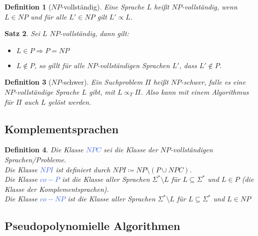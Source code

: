 \documentclass[11pt]{article}
\newcommand{\tcol}[1]{\textcolor{RoyalBlue}{#1}}
\theoremstyle{break}
\newtheorem{satz}{Satz}[section]
\newtheorem{defi}[satz]{Definition}
\begin{document}
    \begin{defi}[$NP$-vollständig]
        Eine Sprache $L$ heißt $NP$-vollständig, wenn $L\in NP$ und für alle $L'\in NP$ gilt $L'\propto L$.
    \end{defi}

    \begin{satz}
        Sei $L$ $NP$-vollständig, dann gilt:
        \begin{itemize}
            \item $L\in P\Rightarrow P=NP$
            \item $L\notin P$, so gillt für alle $NP$-vollständigen Sprachen $L'$, dass $L'\notin P$.
        \end{itemize}
    \end{satz}


    \begin{defi}[$NP$-schwer]
        Ein Suchproblem $\Pi$ heißt $NP$-schwer, falle es eine $NP$-vollständige Sprache $L$ gibt, mit $L\propto_T\Pi$.
        Also kann mit einem Algorithmus für $\Pi$ auch $L$ gelöst werden.
    \end{defi}


    \subsection{Komplementsprachen}
	\label{subsec:komplementsprachen}

    \begin{defi}
        Die Klasse \tcol{$NPC$} sei die Klasse der $NP$-vollständigen Sprachen/Probleme.\\
        Die Klasse \tcol{$NPI$} ist definiert durch $NPI\coloneqq NP\setminus(P\cup NPC)$.\\
        Die Klasse \tcol{$co-P$} ist die Klasse aller Sprachen $\Sigma^*\setminus L$ für $L\subseteq\Sigma^*$ und $L\in P$ (die Klasse der Komplementsprachen).\\
        Die Klasse \tcol{$co-NP$} ist die Klasse aller Sprachen $\Sigma^*\setminus L$ für $L\subseteq\Sigma^*$ und $L\in NP$
    \end{defi}


    \subsection{Pseudopolynomielle Algorithmen
	}\label{subsec:pseudopolynomielle-algorithmenindex}
\end{document}
